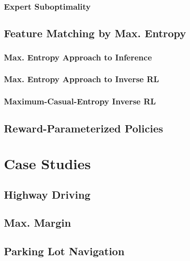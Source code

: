 			\subsubsection{Expert Suboptimality} %

		\subsection{Feature Matching by Max. Entropy} %

			\subsubsection{Max. Entropy Approach to Inference} %

			\subsubsection{Max. Entropy Approach to Inverse RL} %

			\subsubsection{Maximum-Casual-Entropy Inverse RL} %

		\subsection{Reward-Parameterized Policies} %

	\section{Case Studies} %

		\subsection{Highway Driving} %

		\subsection{Max. Margin} %

		\subsection{Parking Lot Navigation} %

